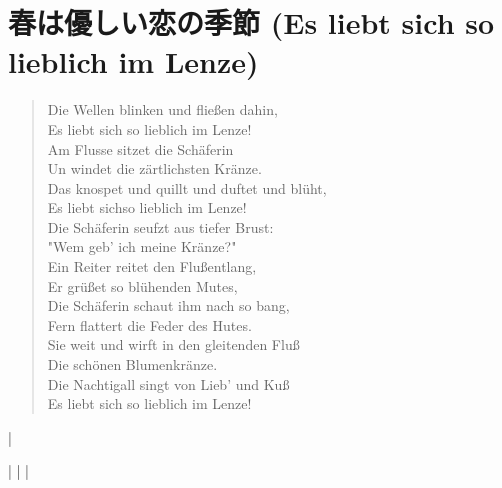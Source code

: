 
\section{春は優しい恋の季節 (Es liebt sich so lieblich im Lenze)}

\begin{quote}
Die Wellen blinken und flie{\ss}en dahin, \\
Es liebt sich so lieblich im Lenze! \\
Am Flusse sitzet die Sch{\"a}ferin \\
Un windet die z{\"a}rtlichsten Kr{\"a}nze. \\

Das knospet und quillt und duftet und bl{\"u}ht, \\
Es liebt sichso lieblich im Lenze! \\
Die Sch{\"a}ferin seufzt aus tiefer Brust: \\
"Wem geb' ich meine Kr{\"a}nze?" \\

Ein Reiter reitet den Flu\ss entlang, \\
Er gr{\"u}{\ss}et so bl{\"u}henden Mutes, \\
Die Sch{\"a}ferin schaut ihm nach so bang, \\
Fern flattert die Feder des Hutes. \\

Sie weit und wirft in den gleitenden Flu\ss \\
Die sch{\"o}nen Blumenkr{\"a}nze. \\
Die Nachtigall singt von Lieb' und Ku\ss \\
Es liebt sich so lieblich im Lenze!
\end{quote}

\musicbegin
	\def\nbinstruments{1}%
	\startextract%
	\Notes{}\enotes
	\NOtes{}\enotes
	\Notes{}\enotes
	\bar
	\NOtes{}\qp\enotes
	\endextract
{}

\musicbegin
	\def\nbinstruments{1}%
	\startextract%
	\NOtes{}\enotes
	\bar
	\NOtes{}\enotes
	\bar
	\NOtes{}\enotes
	\bar
	\NOtes{}\qp\enotes
	\zendextract
{}
